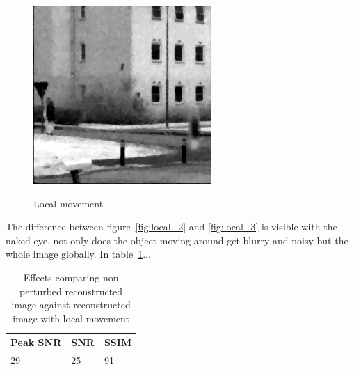 \begin{figure}[H]
\begin{minipage}[t]{0.32\textwidth}
    \label{fig:local_2}
\end{minipage}
\begin{minipage}[t]{0.32\textwidth}
    \includegraphics[width = \textwidth]{result/dynamic/local/local_whole_time_res_psnr_29_snr_25_sssim_91.png}
    \label{fig:local_3}
\end{minipage}
    \caption{Local movement}
    \label{fig:local_dyn}
\end{figure}

The difference between figure~\ref{fig:local_2} and \ref{fig:local_3} is visible with the naked eye, not only does the object moving around get blurry and noisy but the whole image globally. In table~\ref{tab:local_dyn}...

\begin{table}[H]
    \centering
  \begin{tabular}{ | l | l | l |}
    \hline
    Peak SNR & SNR & SSIM \\ \hline
    29 & 25 & 91 \\ 
    \hline
  \end{tabular}
      \caption{Effects comparing non perturbed reconstructed image against reconstructed image with local movement}
    \label{tab:local_dyn}
\end{table}

